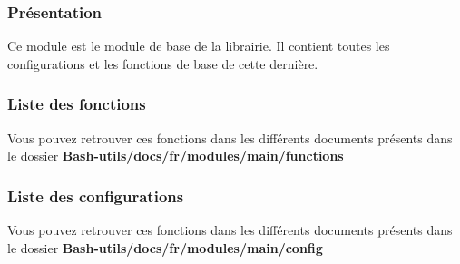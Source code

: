 \documentclass[a4paper,10pt]{article}
\begin{document}
  \color{blue}
  \subsubsection{Présentation}\color{white}
  Ce module est le module de base de la librairie. Il contient toutes les configurations et les fonctions de base de cette dernière.

  \color{blue}
  \subsubsection{Liste des fonctions}\color{white}
  Vous pouvez retrouver ces fonctions dans les différents documents présents dans le dossier \textbf{\color{lime}Bash-utils/docs/fr/modules/main/functions\color{white}}

  \color{blue}
  \subsubsection{Liste des configurations}\color{white}
  Vous pouvez retrouver ces fonctions dans les différents documents présents dans le dossier \textbf{\color{lime}Bash-utils/docs/fr/modules/main/config\color{white}}
    
\end{document}
